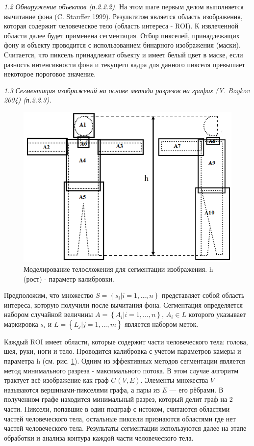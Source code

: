 \textit{1.2 Обнаружение объектов (п.2.2.2).} На этом шаге первым делом выполняется вычитание фона (C. Stauffer 1999). Результатом является область изображения, которая содержит человеческое тело (область интереса - ROI). К извлеченной области далее будет применена сегментация. Отбор пикселей, принадлежащих фону и объекту проводится с использованием бинарного изображения (маски). Считается, что пиксель принадлежит объекту и имеет белый цвет в маске, если разность интенсивности фона и текущего кадра для данного пикселя превышает некоторое пороговое значение.

\textit{1.3 Сегментация изображений на основе метода разрезов на графах (Y. Boykov 2004) (п.2.2.3).}

\begin{figure}[ht!]
\centering
\includegraphics [width=0.45\linewidth] {images/h111.png}
\begin{center}
\caption{Моделирование телосложения для сегментации изображения. h (рост) - параметр калибровки.} \label{img1}
\end{center}
\end{figure}
Предположим, что множество $S=\left\{s_i|i=1, ..., n\right\}$ представляет собой область интереса, которую получили после вычитания фона.
Сегментация определяется набором случайной величины $A=\left\{A_i|i=1, ..., n\right\}$, $A_i\in L $ которого указывает маркировка $s_i$ и $L=\left\{L_j|j=1, ..., m\right\}$ является набором меток.

Каждый ROI имеет области, которые содержит части человеческого тела: голова, шея, руки, ноги и тело. Проводится калибровка с учетом параметров камеры и параметра h (см. рис. \ref{img1}). Одним из эффективных методов сегментации является метод минимального разреза - максимального потока. В этом случае алгоритм трактует всё изображение как граф $G\left(V, E\right)$. Элементы множества $V$ называются вершинами-пикселями графа, а пары из $E$ — его рёбрами. В полученном графе находится минимальный разрез, который делит граф на 2 части. Пиксели, попавшие в один подграф с истоком, считаются областями частей человеческого тела, остальные пиксели признаются областями где нет частей человеческого тела. Результаты сегментации используются далее на этапе обработки и анализа контура каждой части человеческого тела.

